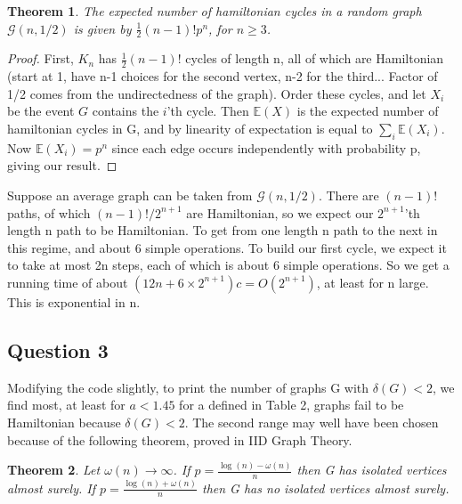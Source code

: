 \documentclass[10pt,a4paper]{report}
\newtheorem*{theorem}{Theorem}
\begin{document}
\begin{theorem} 
The expected number of hamiltonian cycles in a random graph $\mathcal{G}(n,1/2)$ is given by $\frac{1}{2}(n-1)!p^n$, for $n\geq3$.
\end{theorem}
\begin{proof}
First, $K_n$ has $\frac{1}{2}(n-1)!$ cycles of length n, all of which are Hamiltonian (start at 1, have n-1 choices for the second vertex, n-2 for the third... Factor of 1/2 comes from the undirectedness of the graph). Order these cycles, and let $X_i$ be the event $G$ contains the $i$'th cycle. Then $\mathbb{E}(X)$ is the expected number of hamiltonian cycles in G, and by linearity of expectation is equal to $\sum_i \mathbb{E}(X_i)$. Now $\mathbb{E}(X_i) = p^n$ since each edge occurs independently with probability p, giving our result.
\end{proof}

Suppose an average graph can be taken from $\mathcal{G}(n,1/2)$. There are $(n-1)!$ paths, of which $(n-1)!/2^{n+1}$ are Hamiltonian, so we expect our $2^{n+1}$'th length n path to be Hamiltonian. To get from one length n path to the next in this regime, and about 6 simple operations. To build our first cycle, we expect it to take at most 2n steps, each of which is about 6 simple operations. So we get a running time of about $(12n+6\times 2^{n+1})c = O(2^{n+1})$, at least for n large. This is exponential in n.

\subsection*{Question 3}
Modifying the code slightly, to print the number of graphs G with $\delta(G) < 2$, we find most, at least for $a<1.45$ for a defined in Table 2, graphs fail to be Hamiltonian because  $\delta(G) < 2$. The second range may well have been chosen because of the following theorem, proved in IID Graph Theory.

\begin{theorem}
Let $\omega(n) \rightarrow \infty$.  If $p =\frac{\log(n)-\omega(n)}{n}$ then G has isolated vertices almost surely.  If $p =\frac{\log(n)+\omega(n)}{n}$ then G has no isolated vertices almost surely.
\end{theorem}
\end{document}
